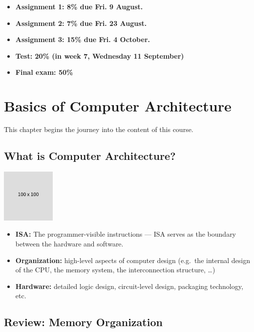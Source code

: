 \documentclass[
  16pt,
  a4paper,
]{report}
\begin{document}
\begin{itemize}
\item
  \textbf{Assignment 1: 8\% due Fri. 9 August.}
\item
  \textbf{Assignment 2: 7\% due Fri. 23 August.}
\item
  \textbf{Assignment 3: 15\% due Fri. 4 October.}
\item
  \textbf{Test: 20\% (in week 7, Wednesday 11 September)}
\item
  \textbf{Final exam: 50\%}
\end{itemize}

\chapter{Basics of Computer
Architecture}\label{basics-of-computer-architecture}

This chapter begins the journey into the content of this course.

\section{What is Computer
Architecture?}\label{what-is-computer-architecture}

\includegraphics{index_files/mediabag/FiKGhYhhIWJYiBgWIoaF.png}

\begin{itemize}
\item
  \textbf{ISA:} The programmer-visible instructions --- ISA serves as
  the boundary between the hardware and software.
\item
  \textbf{Organization:} high-level aspects of computer design (e.g.~the
  internal design of the CPU, the memory system, the interconnection
  structure, \ldots)
\item
  \textbf{Hardware:} detailed logic design, circuit-level design,
  packaging technology, etc.
\end{itemize}

\section{Review: Memory Organization}\label{review-memory-organization}
\end{document}
